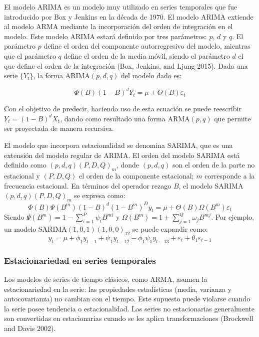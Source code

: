 \documentclass[
  12pt, a4paper, oneside]{article}
\begin{document}
El modelo ARIMA es un modelo muy utilizado en series temporales que fue introducido por Box y Jenkins en la década de 1970. El modelo ARIMA extiende al modelo ARMA mediante la incorporación del orden de integración en el modelo. Este modelo ARIMA estará definido por tres parámetros: \(p\), \(d\) y \(q\). El parámetro \(p\) define el orden del componente autorregresivo del modelo, mientras que el parámetro \(q\) define el orden de la media móvil, siendo el parámetro \(d\) el que define el orden de la integración (Box, Jenkins, and Ljung 2015). Dada una serie \(\{Y_t\}\), la forma ARIMA\((p, d, q)\) del modelo dado es:

\begin{equation}
\Phi(B)(1-B)^d Y_t = \mu + \Theta(B)\varepsilon_t
\end{equation}

Con el objetivo de predecir, haciendo uso de esta ecuación se puede reescribir \(Y_t = (1-B)^d X_t\), dando como resultado una forma ARMA\((p, q)\) que permite ser proyectada de manera recursiva.

El modelo que incorpora estacionalidad se denomina SARIMA, que es una extensión del modelo regular de ARIMA. El orden del modelo SARIMA está definido como \((p, d, q)(P, D, Q)_m\), donde \((p, d, q)\) son el orden de la parte no estacional y \((P, D, Q)\) el orden de la componente estacional; \(m\) corresponde a la frecuencia estacional. En términos del operador rezago \(B\), el modelo SARIMA\((p, d, q)(P, D, Q)_m\) se expresa como:
\begin{equation}
\Phi(B)\Psi(B^m)(1-B)^d(1-B^m)^D y_t = \mu + \Theta(B)\Omega(B^m)\varepsilon_t
\end{equation}
Siendo \(\Psi(B^m) = 1 - \sum_{i=1}^{P} \psi_i B^{mi}\) y \(\Omega(B^m) = 1 + \sum_{j=1}^{Q} \omega_j B^{mj}\). Por ejemplo, un modelo SARIMA\((1,0,1)(1,0,0)_{12}\) se puede expandir como:
\begin{equation}
y_t = \mu + \phi_1 y_{t-1} + \psi_1 y_{t-12} - \phi_1\psi_1 y_{t-13} + \varepsilon_t + \theta_1 \varepsilon_{t-1}
\end{equation}

\subsubsection{Estacionariedad en series temporales}\label{estacionariedad-en-series-temporales}

Los modelos de series de tiempo clásicos, como ARMA, asumen la estacionariedad en la serie: las propiedades estadísticas (media, varianza y autocovarianza) no cambian con el tiempo. Este supuesto puede violarse cuando la serie posee tendencia o estacionalidad. Las series no estacionarias generalmente son convertidas en estacionarias cuando se les aplica transformaciones (Brockwell and Davis 2002).
\end{document}
